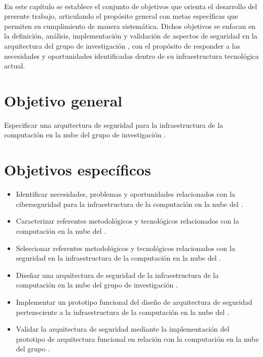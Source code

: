 \label{cap:objetivos}
\mbox{}\\

En este capítulo se establece el conjunto de objetivos que orienta el desarrollo del presente trabajo, articulando el propósito 
general con metas específicas que permiten su cumplimiento de manera sistemática. Dichos objetivos se enfocan en la definición, 
análisis, implementación y validación de aspectos de seguridad en la arquitectura del grupo de investigación \GRID, con el 
propósito de responder a las necesidades y oportunidades identificadas dentro de su infraestructura tecnológica actual.

\section{Objetivo general}\label{cap:objetivoGeneral}

Especificar una arquitectura de seguridad para la infraestructura de la computación en la nube del grupo de investigación \GRID.

\section{Objetivos específicos}\label{cap:objetivosEspecificos}
\begin{itemize}
	\item Identificar necesidades, problemas y oportunidades relacionados con la ciberseguridad para la infraestructura de la computación en la nube del \GRID. 

	\item Caracterizar referentes metodológicos y tecnológicos relacionados con la computación en la nube del \GRID. 

	\item Seleccionar referentes metodológicos y tecnológicos relacionados con la seguridad en la infraestructura de la computación en la nube del \GRID.

	\item Diseñar una arquitectura de seguridad de la infraestructura de la computación en la nube del grupo de investigación \GRID.

	\item Implementar un prototipo funcional del diseño de arquitectura de seguridad perteneciente a la infraestructura de la computación en la nube del \GRID.
	
	\item Validar la arquitectura de seguridad mediante la implementación del prototipo de arquitectura funcional en relación con la computación en la nube del grupo \GRID.
\end{itemize}
